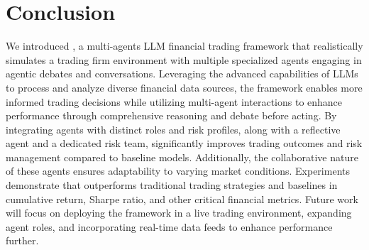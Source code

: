 \section{Conclusion}


We introduced \model, a multi-agents LLM financial trading framework that realistically simulates a trading firm environment with multiple specialized agents engaging in agentic debates and conversations. Leveraging the advanced capabilities of LLMs to process and analyze diverse financial data sources, the framework enables more informed trading decisions while utilizing multi-agent interactions to enhance performance through comprehensive reasoning and debate before acting. By integrating agents with distinct roles and risk profiles, along with a reflective agent and a dedicated risk team, \model significantly improves trading outcomes and risk management compared to baseline models. Additionally, the collaborative nature of these agents ensures adaptability to varying market conditions. Experiments demonstrate that \model outperforms traditional trading strategies and baselines in cumulative return, Sharpe ratio, and other critical financial metrics. Future work will focus on deploying the framework in a live trading environment, expanding agent roles, and incorporating real-time data feeds to enhance performance further.



\clearpage
\newpage
